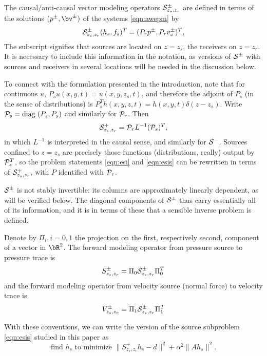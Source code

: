 The causal/anti-causal vector
modeling operators ${\cal S}^{\pm}_{z_s,z_r}$ are defined in terms of
the solutions $(p^{\pm},\bv^{\pm})$ of the systems \ref{eqn:awepm} by
\begin{equation}
  {\cal S}^{\pm}_{z_s,z_r}(h_s,f_s)^T  = (P_rp^{\pm},P_r v_z^{\pm})^T,
  \label{eqn:fwd}
\end{equation}
The subscript signifies that sources are located on $z=z_s$, the
receivers on $z=z_r$. It is necessary to include this information in
the notation, as versions of ${\cal S}^{\pm}$ with sources and receivers in
several locations will be needed in the discussion below.

 To connect with the formulation presented in
the introduction, note that for continuous $u$,
$P_su(x,y,t)=u(x,y,z_s,t)$, and therefore the adjoint of $P_s$ (in the
sense of distributions) is $P_s^Th(x,y,z,t) =
h(x,y,t)\delta(z-z_s)$. Write ${\cal P}_s = \mbox{diag }(P_s,P_s)$ and
similarly for ${\cal P}_r$. Then
\[
  {\cal S}^{+}_{z_s,z_r} = {\cal P}_r L^{-1}({\cal P}_s)^T,
\]
in which $L^{-1}$ is interpreted in the causal sense, and similarly
for ${\cal S}^{-}$. Sources confined to $z=z_s$ are precisely those
functions (distributions, really) output by ${\cal P}_s^T$, so the
problem statements \ref{eqn:esi} and \ref{eqn:esis} can be rewritten
in terms of ${\cal S}^+_{z_s,z_r}$, with $P$ identified with ${\cal P}_r$.

${\cal S}^{\pm}$ is not stably invertible: its columns are
approximately linearly dependent, as will be verified below. The
diagonal components of ${\cal S}^{\pm}$ thus carry essentially all of
its information, and it is in terms of these that a sensible inverse problem
is defined.

Denote by $\Pi_i, i=0,1$ the projection on the first,
respectively second, component of a vector in $\bR^2$. The 
forward modeling operator from pressure source to pressure trace is
\begin{equation}
  \label{eqn:sdef}
  S^{\pm}_{z_s,z_r} = \Pi_0 {\cal S}^{\pm}_{z_s,z_r} \Pi_0^T 
\end{equation}
and the forward modeling operator from velocity source (normal force)
to velocity trace is
\begin{equation}
  \label{eqn:vdef}
  V^{\pm}_{z_s,z_r} = \Pi_1 {\cal S}^{\pm}_{z_s,z_r} \Pi_1^T 
\end{equation}

With these conventions, we can write the version of the source
subproblem \ref{eqn:esis} studied in this paper as
\begin{equation}
  \label{eqn:esisp}
  \mbox{find }h_s\mbox{ to minimize }\|S^{+}_{z_s,z_r}h_s- d\|^2 +
  \alpha^2\|Ah_s\|^2.
\end{equation}

